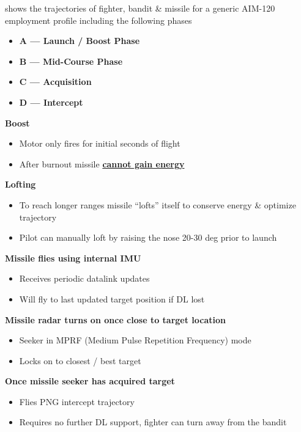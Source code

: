 \begin{tcoloritemize}
     shows the trajectories of fighter, bandit \& missile for a generic AIM-120 employment profile
    including the following phases

    \begin{itemize}
        \item \textbf{A --- Launch / Boost Phase}
        \item \textbf{B --- Mid-Course Phase}
        \item \textbf{C --- Acquisition}
        \item \textbf{D --- Intercept}
    \end{itemize}
    \textbf{Boost}

    \begin{itemize}
        \item Motor only fires for initial seconds of flight 
        \item After burnout missile \textbf{\underline{cannot gain energy}}
    \end{itemize}

    \textbf{Lofting} 

    \begin{itemize}
        \item To reach longer ranges missile ``lofts'' itself to conserve energy \& optimize trajectory
        \item Pilot can manually loft by raising the nose 20-30 deg prior to launch
    \end{itemize}
    \textbf{Missile flies using internal IMU}

    \begin{itemize}
        \item Receives periodic datalink updates
        \item Will fly to last updated target position if DL lost
    \end{itemize}
    \textbf{Missile radar turns on once close to target location}
    \begin{itemize}
        \item Seeker in MPRF (Medium Pulse Repetition Frequency) mode 
        \item Locks on to closest / best target
    \end{itemize}
    \textbf{Once missile seeker has acquired target}
    \begin{itemize}
        \item Flies PNG intercept trajectory
        \item Requires no further DL support, fighter can turn away from the bandit
    \end{itemize}
\end{tcoloritemize}

